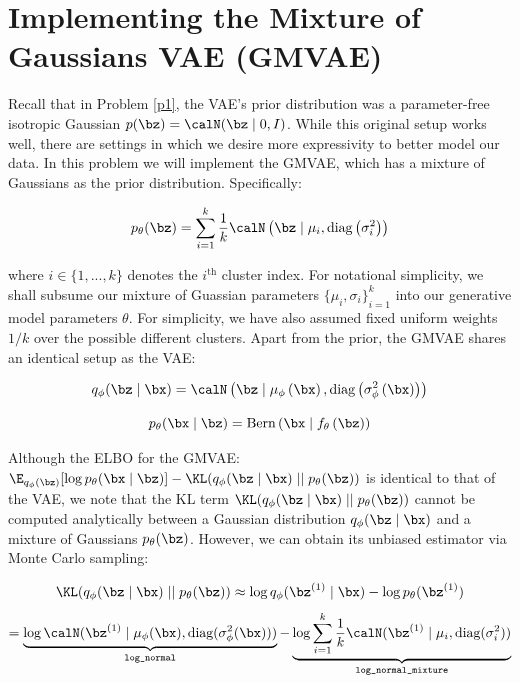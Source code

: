 \section{Implementing the Mixture of Gaussians VAE (GMVAE)}

Recall that in Problem \ref{p1}, the VAE’s prior distribution was a parameter-free isotropic Gaussian $p(\bz) = \calN(\bz \mid 0,I)$. 
While this original setup works well, there are settings in which we desire more expressivity to better model our data. In this 
problem we will implement the GMVAE, which has a mixture of Gaussians as the prior distribution. Specifically:

\begin{equation} \label{eq:7}
    p_{\theta}(\bz) = \sum\limits_{i=1}^{k} \frac{1}{k} \calN\left(\bz \mid \mu_i, \text{diag}\left(\sigma_i^2\right)\right)
\end{equation}

where $i \in \{1,...,k\}$ denotes the $i^{\text{th}}$ cluster index. For notational simplicity, we shall subsume our mixture of 
Guassian parameters ${\{\mu_i, \sigma_i\}}_{i=1}^{k}$ into our generative model parameters $\theta$. For simplicity, we have also 
assumed fixed uniform weights $1/k$ over the possible different clusters. Apart from the prior, the GMVAE shares an identical setup 
as the VAE:

\begin{equation} \label{eq:8}
    q_{\phi}(\bz \mid \bx) = \calN\left(\bz \mid \mu_{\phi}\left(\bx\right), \text{diag}\left(\sigma_{\phi}^2\left(\bx\right)\right)\right)
\end{equation}

\begin{equation} \label{eq:9}
    p_{\theta}(\bx \mid \bz) = \text{Bern}\left(\bx \mid f_{\theta}\left(\bz\right)\right)
\end{equation}

Although the ELBO for the GMVAE: $\E_{q_{\phi}(\bz)}[\log p_{\theta}(\bx \mid \bz)] - \KL(q_{\phi}(\bz \mid \bx) \mid\mid p_{\theta}(\bz))$ is identical to 
that of the VAE, we note that the KL term $\KL(q_{\phi}(\bz \mid \bx) \mid\mid p_{\theta}(\bz))$ cannot be computed analytically 
between a Gaussian distribution $q_{\phi}(\bz \mid \bx)$ and a mixture of Gaussians $p_{\theta}(\bz)$. However, we can obtain its 
unbiased estimator via Monte Carlo sampling:

\begin{equation} \label{eq:10}
    \KL(q_{\phi}(\bz \mid \bx) \mid\mid p_{\theta}(\bz)) \approx \log q_{\phi}(\bz^{(1)} \mid \bx) - \log p_{\theta}(\bz^{(1)})
\end{equation}
\begin{equation} \label{eq:11}
    = \underbrace{\log \calN(\bz^{(1)} \mid \mu_{\phi}(\bx), \text{diag}(\sigma_{\phi}^2(\bx)))}_\text{\texttt{log\_normal}} - \underbrace{\log\sum\limits_{i=1}^{k} \frac{1}{k}\calN(\bz^{(1)}\mid\mu_i,\text{diag}(\sigma_i^2))}_\text{\texttt{log\_normal\_mixture}}
\end{equation}

